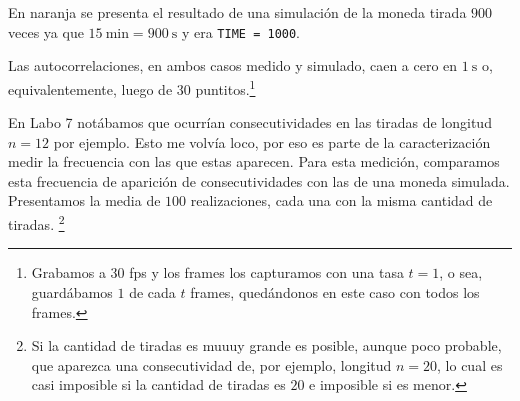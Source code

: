 \documentclass[a4paper]{article}
\begin{document}
En naranja se presenta el resultado de una simulación de la moneda tirada $900$ veces ya que $\SI{15}{\minute} = \SI{900}{\second}$ y era \texttt{TIME = 1000}.

Las autocorrelaciones, en ambos casos medido y simulado, caen a cero en $\SI{1}{\second}$ o, equivalentemente, luego de $30$ puntitos.\footnote{Grabamos a $30$ fps y los frames los capturamos con una tasa $t = 1$, o sea, guardábamos $1$ de cada $t$ frames, quedándonos en este caso con todos los frames.}

En Labo 7 notábamos que ocurrían consecutividades en las tiradas de longitud $n=12$ por ejemplo. Esto me volvía loco, por eso es parte de la caracterización medir la frecuencia con las que estas aparecen. Para esta medición, comparamos esta frecuencia de aparición de consecutividades con las de una moneda simulada. Presentamos la media de $100$ realizaciones, cada una con la misma cantidad de tiradas. \footnote{Si la cantidad de tiradas es muuuy grande es posible, aunque poco probable, que aparezca una consecutividad de, por ejemplo, longitud $n=20$, lo cual es casi imposible si la cantidad de tiradas es $20$ e imposible si es menor.}
\end{document}
